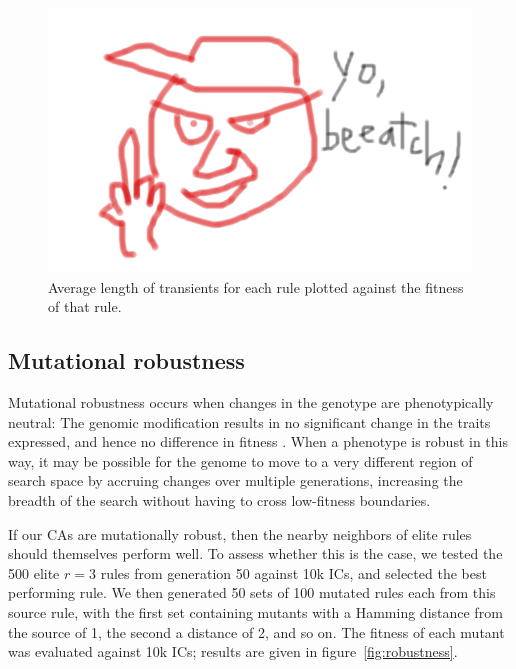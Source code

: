 \begin{figure}
\begin{center}
\includegraphics[width=\linewidth]{foo.png}
\caption{Average length of transients for each rule plotted against the fitness of that rule.}
\label{fig:transients}
\end{center}
\end{figure}

\subsection{Mutational robustness} \label{sec:2_2}

Mutational robustness occurs when changes in the genotype are phenotypically neutral: The genomic modification results in no significant change 
in the traits expressed, and hence no difference in fitness \cite{wagner_role_2012}. When a phenotype is robust in this way, it may be possible for the 
genome to move to a very different region of search space by accruing changes over multiple generations, increasing the breadth of the search without 
having to cross low-fitness boundaries.

If our CAs are mutationally robust, then the nearby neighbors of elite rules should themselves perform well. To assess whether 
this is the case, we tested the 500 elite $r = 3$ rules from generation 50 against 10k ICs, and selected the best performing rule. 
We then generated 50 sets of 100 mutated rules each from this source rule, with the first set containing mutants with a Hamming distance from the 
source of 1, the second a distance of 2, and so on. The fitness of each mutant was evaluated against 10k ICs; results are given in 
figure~\ref{fig:robustness}.

